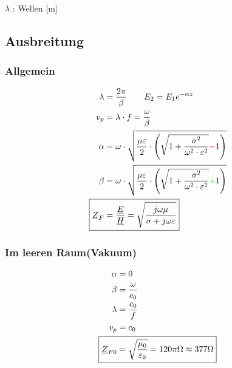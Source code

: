 $\lambda$ : Wellen [m]

\subsection{Ausbreitung}
\subsubsection{Allgemein}
\begin{align*}
    \lambda                 & = \dfrac{2\pi}{\beta} \qquad E_2 = E_1 e^{-\alpha z}                                                                                        \\
    v_p                     & = \lambda\cdot f = \dfrac{\omega}{\beta}                                                                                                    \\
    \alpha                  & = \omega \cdot \sqrt{\dfrac{\mu \varepsilon}{2}\cdot \left(\sqrt{1+\dfrac{\sigma^2}{\omega^2\cdot\varepsilon^2}}{\color{red}{-}}1\right)}   \\
    \beta                   & = \omega \cdot \sqrt{\dfrac{\mu \varepsilon}{2}\cdot \left(\sqrt{1+\dfrac{\sigma^2}{\omega^2\cdot\varepsilon^2}}{\color{green}{+}}1\right)} \\
    \Aboxed{\underline{Z}_F & = \dfrac{\underline{E}}{\underline{H}} = \sqrt{\dfrac{j\omega\mu}{\sigma+j\omega\varepsilon}}}                                              \\
\end{align*}

\subsubsection{Im leeren Raum(Vakuum)}
\begin{align*}
    \alpha                     & = 0                                                                    \\
    \beta                      & = \dfrac{\omega}{c_0}                                                  \\
    \lambda                    & = \dfrac{c_0}{f}                                                       \\
    v_p                        & = c_0                                                                  \\
    \Aboxed{\underline{Z}_{F0} & = \sqrt{\dfrac{\mu_0}{\varepsilon_0}} = 120 \pi\Omega\approx377\Omega}
\end{align*}


